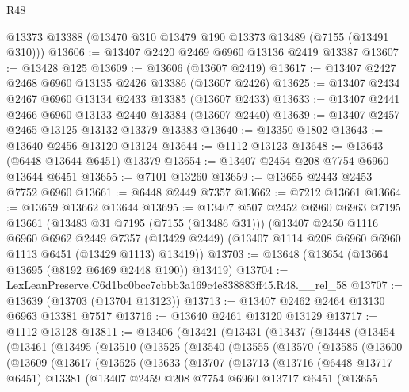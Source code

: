 \begin{lexlean}{R48}
\begin{coremodule}
    @13373
    @13388
    (@13470 @310 @13479 @190 @13373 @13489 (@7155 (@13491 @310)))
@13606 := @13407 @2420 @2469 @6960 @13136 @2419 @13387
@13607 := @13428 @125
@13609 := @13606 (@13607 @2419)
@13617 := @13407 @2427 @2468 @6960 @13135 @2426 @13386 (@13607 @2426)
@13625 := @13407 @2434 @2467 @6960 @13134 @2433 @13385 (@13607 @2433)
@13633 := @13407 @2441 @2466 @6960 @13133 @2440 @13384 (@13607 @2440)
@13639 := @13407 @2457 @2465 @13125 @13132 @13379 @13383
@13640 := @13350 @1802
@13643 := @13640 @2456 @13120 @13124
@13644 := @1112 @13123
@13648 := @13643 (@6448 @13644 @6451) @13379
@13654 := @13407 @2454 @208 @7754 @6960 @13644 @6451
@13655 := @7101 @13260
@13659 := @13655 @2443 @2453 @7752 @6960
@13661 := @6448 @2449 @7357
@13662 := @7212 @13661
@13664 := @13659 @13662 @13644
@13695 := @13407
    @507
    @2452
    @6960
    @6963
    @7195
    @13661
    (@13483 @31 @7195 (@7155 (@13486 @31)))
    (@13407
      @2450
      @1116
      @6960
      @6962
      @2449
      @7357
      (@13429 @2449)
      (@13407 @1114 @208 @6960 @6960 @1113 @6451 (@13429 @1113) @13419))
@13703 := @13648 (@13654 (@13664 @13695 (@8192 @6469 @2448 @190)) @13419)
@13704 := LexLeanPreserve.C6d1bc0bcc7cbbb3a169c4e838883ff45.R48.__rel_58
@13707 := @13639 (@13703 (@13704 @13123))
@13713 := @13407 @2462 @2464 @13130 @6963 @13381 @7517
@13716 := @13640 @2461 @13120 @13129
@13717 := @1112 @13128
@13811 := @13406
    (@13421
      (@13431
        (@13437
          (@13448
            (@13454
              (@13461
                (@13495
                  (@13510
                    (@13525
                      (@13540
                        (@13555
                          (@13570
                            (@13585
                              (@13600
                                (@13609
                                  (@13617
                                    (@13625
                                      (@13633
                                        (@13707
                                          (@13713
                                            (@13716
                                              (@6448 @13717 @6451)
                                              @13381
                                              (@13407
                                                @2459
                                                @208
                                                @7754
                                                @6960
                                                @13717
                                                @6451
                                                (@13655

\end{coremodule}
\end{lexlean}
